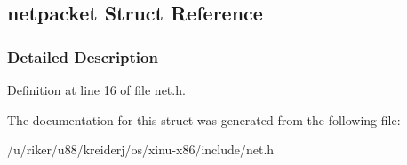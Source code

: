 \hypertarget{structnetpacket}{}\subsection{netpacket Struct Reference}
\label{structnetpacket}


\subsubsection{Detailed Description}


Definition at line 16 of file net.\+h.



The documentation for this struct was generated from the following file\+:\begin{DoxyCompactItemize}
\item 
/u/riker/u88/kreiderj/os/xinu-\/x86/include/net.\+h\end{DoxyCompactItemize}
